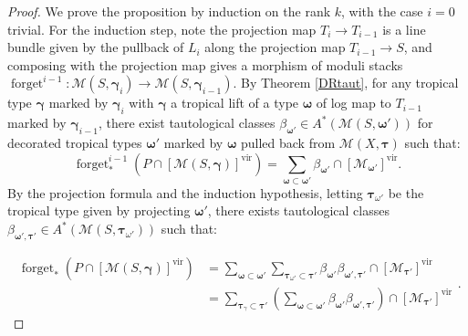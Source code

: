 \documentclass[12pt, oneside]{amsart}   	%
\newcounter{thm}
\newtheorem{remark}[thm]{Remark}
\newcommand{\vir}{\operatorname{vir}}
\newcommand{\forget}{\operatorname{forget}}
\numberwithin{equation}{section}
\numberwithin{thm}{section}
\numberwithin{figure}{section}
\begin{document}
\begin{proof}
We prove the proposition by induction on the rank $k$, with the case $i=0$ trivial. For the induction step, note the projection map $T_{i} \rightarrow T_{i-1}$ is a line bundle given by the pullback of $L_i$ along the projection map $T_{i-1} \rightarrow S$, and composing with the projection map gives a morphism of moduli stacks $\forget^{i-1}: \mathscr{M}(S,\pmb\gamma_i) \rightarrow \mathscr{M}(S,\pmb\gamma_{i-1})$. By Theorem \ref{DRtaut}, for any tropical type $\pmb\gamma$ marked by $\pmb\gamma_i$ with $\pmb\gamma$ a tropical lift of a type $\pmb\omega$ of log map to $T_{i-1}$ marked by $\pmb\gamma_{i-1}$, there exist tautological classes $\beta_{\pmb\omega'} \in A^*(\mathscr{M}(S,\pmb\omega'))$ for decorated tropical types $\pmb\omega'$ marked by $\pmb\omega$ pulled back from $\mathscr{M}(X,\pmb\tau)$ such that:
$$\forget^{i-1}_*(P\cap [\mathscr{M}(S,\pmb\gamma)]^{\vir}) =\sum_{\pmb\omega\subset \pmb\omega'} \beta_{\pmb\omega'}\cap[\mathscr{M}_{\pmb\omega'}]^{\vir}.$$ By the projection formula and the induction hypothesis, letting $\pmb\tau_{\omega'}$ be the tropical type given by projecting $\pmb\omega'$, there exists tautological classes $\beta_{\pmb\omega',\pmb\tau'} \in A^*(\mathscr{M}(S,\pmb\tau_{\omega'}))$ such that:


\begin{equation}
\begin{split}
\forget_*(P\cap[\mathscr{M}(S,\pmb\gamma)]^{\vir}) &= \sum_{\pmb\omega \subset \pmb\omega'}\sum_{\pmb\tau_{\omega'}\subset \pmb\tau'} \beta_{\pmb\omega'}\beta_{\pmb\omega',\pmb\tau'} \cap[\mathscr{M}_{\pmb\tau'}]^{\vir}\\
&= \sum_{\pmb\tau_{\gamma}\subset \pmb\tau'} (\sum_{\pmb\omega\subset \pmb\omega'}\beta_{\pmb\omega'}\beta_{\pmb\omega',\pmb\tau'})\cap[\mathscr{M}_{\pmb\tau'}]^{\vir}
\end{split}.
\end{equation}
\end{proof}

\end{document}

